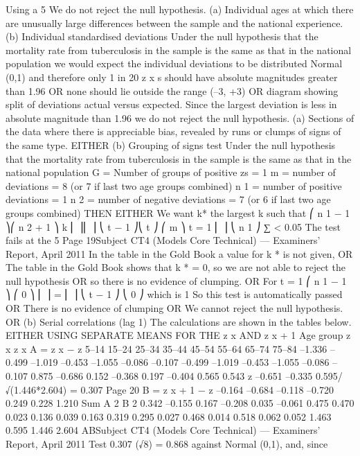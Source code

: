 \documentclass[a4paper,12pt]{article}
\begin{document}
\begin{enumerate}
Using a 5%
We do not reject the null hypothesis.
(a) Individual ages at which there are unusually large differences between the sample and the national experience.
(b) Individual standardised deviations
Under the null hypothesis that the mortality rate from tuberculosis in the sample is the same as that in the national population
we would expect the individual deviations to be distributed Normal (0,1) and therefore only 1 in 20 z x s should have absolute magnitudes greater than
1.96
OR
none should lie outside the range (–3, +3)
OR
diagram showing split of deviations actual versus expected.
Since the largest deviation is less in absolute magnitude than 1.96 we do not reject the null hypothesis.
(a)
Sections of the data where there is appreciable bias, revealed by runs or clumps of signs of the same type.
EITHER
(b)
Grouping of signs test
Under the null hypothesis that the mortality rate from tuberculosis in the
sample is the same as that in the national population
G = Number of groups of positive zs = 1
m = number of deviations = 8 (or 7 if last two age groups combined)
n 1 = number of positive deviations = 1
n 2 = number of negative deviations = 7 (or 6 if last two age groups combined)
THEN EITHER
We want k* the largest k such that
⎛ n 1 − 1 ⎞⎛ n 2 + 1 ⎞
k ⎜
⎟⎜
⎟
⎝ t − 1 ⎠⎝ t ⎠
⎛ m ⎞
t = 1
⎜ ⎟
⎝ n 1 ⎠
∑
< 0.05
The test fails at the 5%
Page 19Subject CT4 (Models Core Technical) — Examiners’ Report, April 2011
In the table in the Gold Book a value for k * is not given,
OR
The table in the Gold Book shows that k * = 0,
so we are not able to reject the null hypothesis
OR
so there is no evidence of clumping.
OR
For t = 1
⎛ n 1 − 1 ⎞ ⎛ 0 ⎞
⎜
⎟ = ⎜ ⎟
⎝ t − 1 ⎠ ⎝ 0 ⎠
which is 1
So this test is automatically passed
OR
There is no evidence of clumping
OR
We cannot reject the null hypothesis.
OR
(b)
Serial correlations (lag 1)
The calculations are shown in the tables below.
EITHER USING SEPARATE MEANS FOR THE z x AND z x + 1
Age
group z x z x A = z x − z
5–14
15–24
25–34
35–44
45–54
55–64
65–74
75–84 –1.336
–0.499
–1.019
–0.453
–1.055
–0.086
–0.107 –0.499
–1.019
–0.453
–1.055
–0.086
–0.107
0.875 –0.686
0.152
–0.368
0.197
–0.404
0.565
0.543
z –0.651 –0.335
0.595/√(1.446*2.604) = 0.307
Page 20
B = z x + 1 − z
–0.164
–0.684
–0.118
–0.720
0.249
0.228
1.210
Sum
A 2 B 2
0.342
–0.155
0.167
–0.208
0.035
–0.061
0.475 0.470
0.023
0.136
0.039
0.163
0.319
0.295 0.027
0.468
0.014
0.518
0.062
0.052
1.463
0.595 1.446 2.604
ABSubject CT4 (Models Core Technical) — Examiners’ Report, April 2011
Test 0.307 (√8) = 0.868 against Normal (0,1), and, since

\end{enumerate}
\end{document}
